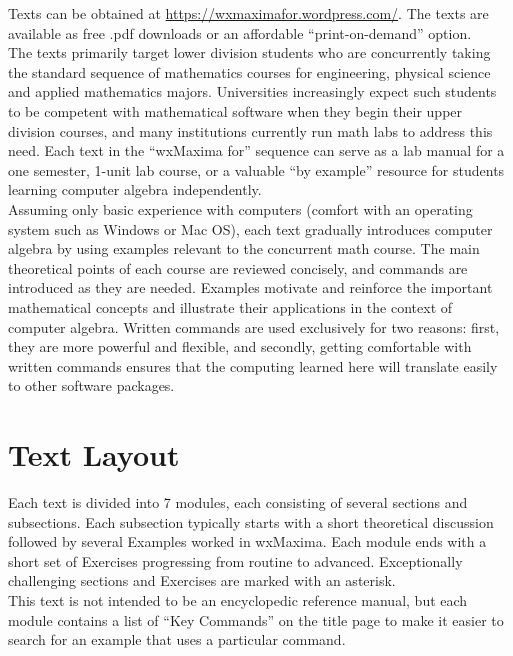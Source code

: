 \documentclass[10.5pt,twoside]{report}
\theoremstyle{definition}
\begin{document}
Texts can be obtained at
\url{https://wxmaximafor.wordpress.com/}. The texts are available as free .pdf downloads or an affordable ``print-on-demand'' option. \\

The texts primarily target lower division students who are concurrently taking the standard sequence of mathematics courses for engineering, physical science and applied mathematics majors.  Universities increasingly expect such students to be competent with mathematical software when they begin their upper division courses, and many institutions currently run math labs to address this need.  Each text in the ``wxMaxima for'' sequence can serve as a lab manual for a one semester, 1-unit lab course, or a valuable ``by example'' resource for students learning computer algebra independently.\\

Assuming only basic experience with computers (comfort with an operating system such as Windows or Mac OS), each text gradually introduces computer algebra by using examples relevant to the concurrent math course.  The main theoretical points of each course are reviewed concisely, and commands are introduced as they are needed.  Examples motivate and reinforce the important mathematical concepts and illustrate their applications in the context of computer algebra.  Written commands are used exclusively for two reasons:  first, they are more powerful and flexible, and secondly,  getting comfortable with written commands ensures that the computing learned here will translate easily to other software packages.  



\section*{\large{Text Layout}}

Each text is divided into 7 modules, each consisting of several sections and subsections.  Each subsection typically starts with a short theoretical discussion followed by several Examples worked in wxMaxima.  Each module ends with a short set of Exercises progressing from routine to advanced.  Exceptionally challenging sections and Exercises are marked with an asterisk.\\

This text is not intended to be an encyclopedic reference manual, but each module contains a list of ``Key Commands'' on the title page to make it easier to search for an example that uses a particular command.\\
\end{document}
